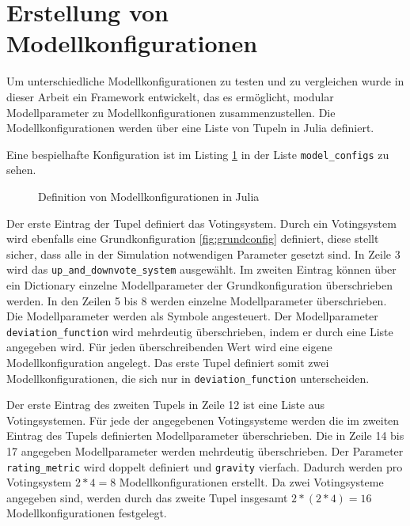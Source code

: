 \section{Erstellung von Modellkonfigurationen}

Um unterschiedliche Modellkonfigurationen zu testen und zu vergleichen wurde in dieser Arbeit ein Framework entwickelt, das es ermöglicht, modular Modellparameter zu Modellkonfigurationen zusammenzustellen. Die Modellkonfigurationen werden über eine Liste von Tupeln in Julia definiert.

Eine bespielhafte Konfiguration ist im Listing \ref{conf} in der Liste \texttt{model\_configs} zu sehen.

\captionsetup[figure]{name=Listing}

\begin{figure}[!h]

	
		\caption{Definition von Modellkonfigurationen in Julia}
	\label{conf}
\end{figure}

Der erste Eintrag der Tupel definiert das Votingsystem. Durch ein Votingsystem wird ebenfalls eine Grundkonfiguration \ref{fig:grundconfig} definiert, diese stellt sicher, dass alle in der Simulation notwendigen Parameter gesetzt sind. In Zeile 3 wird das \texttt{up\_and\_downvote\_system} ausgewählt. Im zweiten Eintrag können über ein Dictionary einzelne Modellparameter der Grundkonfiguration überschrieben werden. In den Zeilen 5 bis 8 werden einzelne Modellparameter überschrieben. Die Modellparameter werden als Symbole angesteuert. Der Modellparameter \texttt{deviation\_function} wird mehrdeutig überschrieben, indem er durch eine Liste angegeben wird. Für jeden überschreibenden Wert wird eine eigene Modellkonfiguration angelegt. Das erste Tupel definiert somit zwei Modellkonfigurationen, die sich nur in \texttt{deviation\_function} unterscheiden. 

Der erste Eintrag des zweiten Tupels in Zeile 12 ist eine Liste aus Votingsystemen. Für jede der angegebenen Votingsysteme werden die im zweiten Eintrag des Tupels definierten Modellparameter überschrieben. Die in Zeile 14 bis 17 angegeben Modellparameter werden mehrdeutig überschrieben. Der Parameter \texttt{rating\_metric} wird doppelt definiert und \texttt{gravity} vierfach. Dadurch werden pro Votingsystem $2 * 4 = 8$ Modellkonfigurationen erstellt. Da zwei Votingsysteme angegeben sind, werden durch das zweite Tupel insgesamt $2 * (2* 4) = 16$ Modellkonfigurationen festgelegt. 

